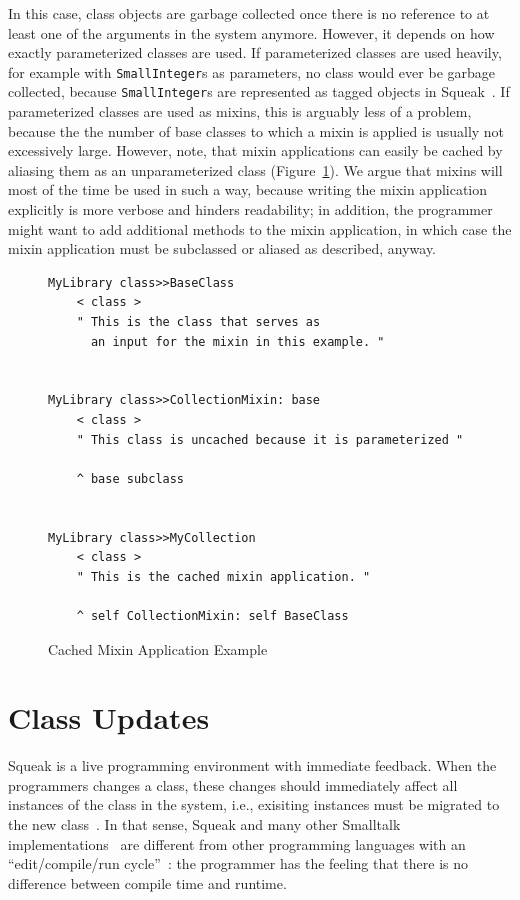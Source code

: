 In this case, class objects are garbage collected once there is no reference to at least one of the arguments in the system anymore. However, it depends on how exactly parameterized classes are used. If parameterized classes are used heavily, for example with \texttt{SmallInteger}s as parameters, no class would ever be garbage collected, because \texttt{SmallInteger}s are represented as tagged objects in Squeak~\cite{Bolz:2008:BFO:1482373.1482382, papetechreport}. If parameterized classes are used as mixins, this is arguably less of a problem, because the the number of base classes to which a mixin is applied is usually not excessively large. However, note, that mixin applications can easily be cached by aliasing them as an unparameterized class (Figure~\ref{fig:impl_cached_mixin_application}). We argue that mixins will most of the time be used in such a way, because writing the mixin application explicitly is more verbose and hinders readability; in addition, the programmer might want to add additional methods to the mixin application, in which case the mixin application must be subclassed or aliased as described, anyway.

\begin{figure}[!htp]
\begin{lstlisting}
MyLibrary class>>BaseClass
	< class >
	" This is the class that serves as 
	  an input for the mixin in this example. "
	

MyLibrary class>>CollectionMixin: base
    < class >
    " This class is uncached because it is parameterized "

    ^ base subclass


MyLibrary class>>MyCollection
    < class >
    " This is the cached mixin application. "

    ^ self CollectionMixin: self BaseClass
\end{lstlisting}
\caption{Cached Mixin Application Example}
\label{fig:impl_cached_mixin_application}
\end{figure}

\section{Class Updates}
Squeak is a live programming environment with immediate feedback. When the programmers changes a class, these changes should immediately affect all instances of the class in the system, i.e., exisiting instances must be migrated to the new class~\cite{casaccio2011bootstrapping}. In that sense, Squeak and many other Smalltalk implementations~\cite{Penney:1987:CMG:38765.38817} are different from other programming languages with an ``edit/compile/run cycle''~\cite{conf/sofsem/NierstraszG10}: the programmer has the feeling that there is no difference between compile time and runtime.

